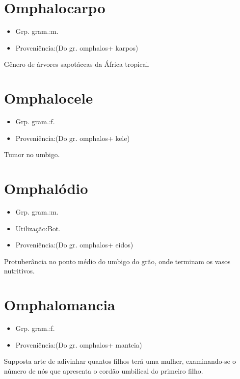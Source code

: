 \section{Omphalocarpo}
\begin{itemize}
\item {Grp. gram.:m.}
\end{itemize}
\begin{itemize}
\item {Proveniência:(Do gr. \textunderscore omphalos\textunderscore  + \textunderscore karpos\textunderscore )}
\end{itemize}
Gênero de árvores sapotáceas da África tropical.
\section{Omphalocele}
\begin{itemize}
\item {Grp. gram.:f.}
\end{itemize}
\begin{itemize}
\item {Proveniência:(Do gr. \textunderscore omphalos\textunderscore  + \textunderscore kele\textunderscore )}
\end{itemize}
Tumor no umbigo.
\section{Omphalódio}
\begin{itemize}
\item {Grp. gram.:m.}
\end{itemize}
\begin{itemize}
\item {Utilização:Bot.}
\end{itemize}
\begin{itemize}
\item {Proveniência:(Do gr. \textunderscore omphalos\textunderscore  + \textunderscore eidos\textunderscore )}
\end{itemize}
Protuberância no ponto médio do umbigo do grão, onde terminam os vasos nutritivos.
\section{Omphalomancia}
\begin{itemize}
\item {Grp. gram.:f.}
\end{itemize}
\begin{itemize}
\item {Proveniência:(Do gr. \textunderscore omphalos\textunderscore  + \textunderscore manteia\textunderscore )}
\end{itemize}
Supposta arte de adivinhar quantos filhos terá uma mulher, examinando-se o número de nós que apresenta o cordão umbilical do primeiro filho.
